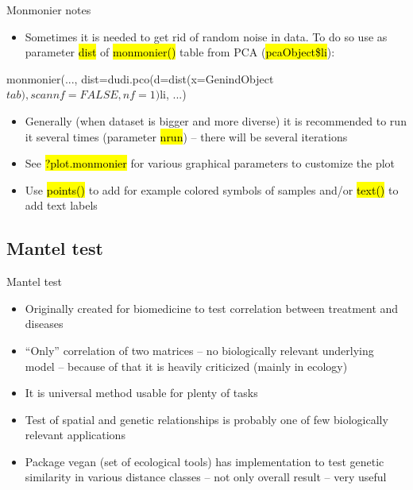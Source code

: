 \documentclass[compress, ucs, xelatex, 11pt, xcolor=svgnames,
  hyperref={
    bookmarks=true,
    unicode=true,
    colorlinks=true,
    pdftitle={Molecular data in R},
    plainpages=false,
    pdfauthor={Vojtech Zeisek},
    pdfsubject={Course about phylogeny and evolution in R},
    pdfcreator={XeLaTeX},
    pdfkeywords={R, evolution, phylogeny, molecular data},
    linkcolor=Tomato,
    anchorcolor=SaddleBrown,
    citecolor=Goldenrod,
    filecolor=DarkMagenta,
    menucolor=Sienna,
    urlcolor=DarkTurquoise,
    pdftex},
  url={hyphens, lowtilde} %
  ]{beamer}
\renewcommand{\texttt}[1]{\hl{\ttfamily #1}}
\begin{document}
\begin{frame}[fragile]{Monmonier notes}
  \begin{itemize}
    \item Sometimes it is needed to get rid of random noise in data. To do so use as parameter \texttt{dist} of \texttt{monmonier()} table from PCA (\texttt{pcaObject\$li}):
  \end{itemize}
  \begin{spluscode}
    monmonier(..., dist=dudi.pco(d=dist(x=GenindObject$tab),
      scannf=FALSE, nf=1)$li, ...)
  \end{spluscode}
  \begin{itemize}
    \item Generally (when dataset is bigger and more diverse) it is recommended to run it several times (parameter \texttt{nrun}) -- there will be several iterations
    \item See \texttt{?plot.monmonier} for various graphical parameters to customize the plot
    \item Use \texttt{points()} to add for example colored symbols of samples and/or \texttt{text()} to add text labels
  \end{itemize}
\end{frame}

\subsection{Mantel test}

\begin{frame}{Mantel test}
  \begin{itemize}
    \item Originally created for biomedicine to test correlation between treatment and diseases
    \item ``Only'' correlation of two matrices -- no biologically relevant underlying model -- because of that it is heavily criticized (mainly in ecology)
    \item It is universal method usable for plenty of tasks
    \item Test of spatial and genetic relationships is probably one of few biologically relevant applications
    \item Package vegan (set of ecological tools) has implementation to test genetic similarity in various distance classes -- not only overall result -- very useful
  \end{itemize}
\end{frame}
\end{document}
